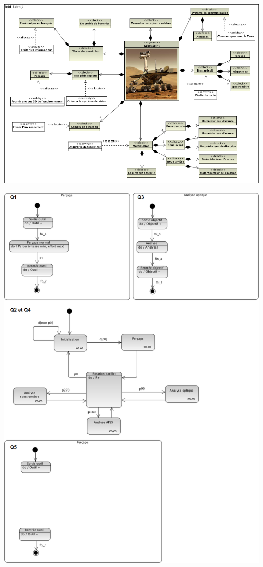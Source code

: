 \documentclass[10pt,fleqn]{article} %
\begin{document}
\begin{center}
\includegraphics[width=\linewidth]{images/fig_04.png}
\end{center}


\begin{center}
\includegraphics[width=\linewidth]{images/fig_08.png}
\end{center}
\end{document}
